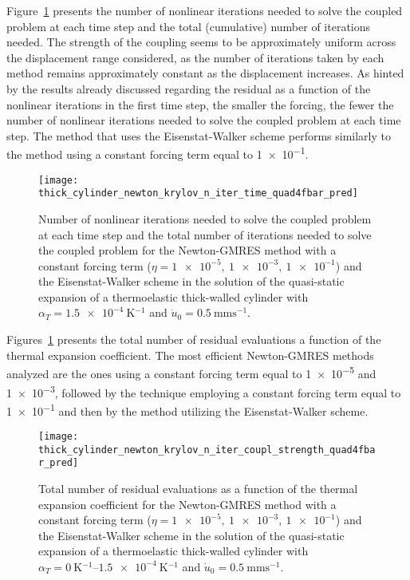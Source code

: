 Figure~\ref{fig:thick_cylinder_newton_krylov_n_iter_time_quad4fbar_pred} presents the number of nonlinear iterations needed to solve the coupled problem at each time step and the total (cumulative) number of iterations needed.
The strength of the coupling seems to be approximately uniform across the displacement range considered, as the number of iterations taken by each method remains approximately constant as the displacement increases.
As hinted by the results already discussed regarding the residual as a function of the nonlinear iterations in the first time step, the smaller the forcing, the fewer the number of nonlinear iterations needed to solve the coupled problem at each time step.
The method that uses the Eisenstat-Walker scheme performs similarly to the method using a constant forcing term equal to \num{1e-1}.

\begin{figure}
 \centering
 \texttt{[image: thick\_cylinder\_newton\_krylov\_n\_iter\_time\_quad4fbar\_pred]}
 \caption{Number of nonlinear iterations needed to solve the coupled problem at each time step and the total number of iterations needed to solve the coupled problem for the Newton-GMRES method with a constant forcing term (\(\eta=\num{1e-5},\ \num{1e-3},\ \num{1e-1}\)) and the Eisenstat-Walker scheme in the solution of the quasi-static expansion of a thermoelastic thick-walled cylinder with \(\alpha_T=\SI{1.5e-4}{\kelvin^{-1}}\) and \(\dot u_0 =\SI{0.5}{\milli\meter\second^{-1}}\).}
\label{fig:thick_cylinder_newton_krylov_n_iter_time_quad4fbar_pred}
\end{figure}

Figures~\ref{fig:thick_cylinder_newton_krylov_n_iter_time_quad4fbar_pred} presents the total number of residual evaluations a function of the thermal expansion coefficient.
The most efficient Newton-GMRES methods analyzed are the ones using a constant forcing term equal to \num{1e-5} and \num{1e-3}, followed by the technique employing a constant forcing term equal to \num{1e-1} and then by the method utilizing the Eisenstat-Walker scheme.

\begin{figure}
 \centering
 \texttt{[image: thick\_cylinder\_newton\_krylov\_n\_iter\_coupl\_strength\_quad4fbar\_pred]}
 \caption{Total number of residual evaluations as a function of the thermal expansion coefficient for the Newton-GMRES method with a constant forcing term (\(\eta=\num{1e-5},\ \num{1e-3},\ \num{1e-1}\)) and the Eisenstat-Walker scheme in the solution of the quasi-static expansion of a thermoelastic thick-walled cylinder with \(\alpha_T=\SIrange{0}{1.5e-4}{\kelvin^{-1}}\) and \(\dot u_0 =\SI{0.5}{\milli\meter\second^{-1}}\).}
\label{fig:thick_cylinder_newton_krylov_n_iter_coupl_strength_quad4fbar_pred}
\end{figure}

